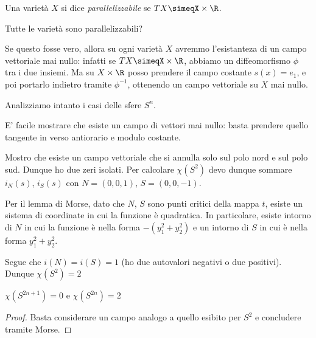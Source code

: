 
\begin{defn}
 Una varietà $X$ si dice \emph{parallelizzabile} se $TX\simeqX\times\R$.
\end{defn}
Tutte le varietà sono parallelizzabili?
\begin{oss}
 Se questo fosse vero, allora su ogni varietà $X$ avremmo l'esistanteza di un campo vettoriale mai nullo: infatti se $TX\simeqX\times\R$, abbiamo un diffeomorfismo $\phi$ tra i due insiemi.
 Ma su $X\times\R$ posso prendere il campo costante $s(x)=e_1$, e poi portarlo indietro tramite $\phi^{-1}$, ottenendo un campo vettoriale su $X$ mai nullo.

\end{oss}
Analizziamo intanto i casi delle sfere $S^n$.
\begin{es}[$S^1$]
 E' facile mostrare che esiste un campo di vettori mai nullo: basta prendere quello tangente in verso antiorario e modulo costante.
\end{es}
\begin{es}[$S^2$]
 Mostro che esiste un campo vettoriale che si annulla solo sul polo nord e sul polo sud.
 Dunque ho due zeri isolati. Per calcolare $\chi(S^2)$ devo dunque sommare $i_N(s)$, $i_S(s)$ con $N= (0,0,1)$, $S=(0,0,-1)$.
 \begin{oss} Per il lemma di Morse, dato che $N$, $S$ sono punti critici della mappa $t$, esiste un sistema di coordinate in cui la funzione è quadratica. 
 In particolare, esiste intorno di $N$ in cui la funzione è nella forma $-(y_1^2+y_2^2)$ e un intorno di $S$ in cui è nella forma $y_1^2+y_2^2$.
 \end{oss}
 Segue che $i(N)=i(S)=1$ (ho due autovalori negativi o due positivi).
 Dunque $\chi(S^2)=2$
\end{es}
\begin{prop}
 $\chi(S^{2n+1})=0$ e $\chi(S^{2n})=2$
 \end{prop}
 \begin{proof}
  Basta considerare un campo analogo a quello esibito per $S^{2}$ e concludere tramite Morse.
 \end{proof}

